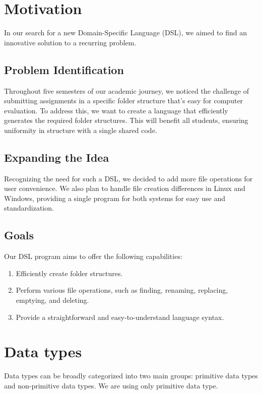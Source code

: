 \documentclass{article}
\begin{document}
\section{Motivation}

In our search for a new Domain-Specific Language (DSL), we aimed to find an innovative solution to a recurring problem.

\subsection{Problem Identification}

Throughout five semesters of our academic journey, we noticed the challenge of submitting assignments in a specific folder structure that's easy for computer evaluation. To address this, we want to create a language that efficiently generates the required folder structures. This will benefit all students, ensuring uniformity in structure with a single shared code.

\subsection{Expanding the Idea}

Recognizing the need for such a DSL, we decided to add more file operations for user convenience. We also plan to handle file creation differences in Linux and Windows, providing a single program for both systems for easy use and standardization.

\subsection{Goals}
Our DSL program aims to offer the following capabilities:

\begin{enumerate}
  \item Efficiently create folder structures.
  \item Perform various file operations, such as finding, renaming, replacing, emptying, and deleting.
  \item Provide a straightforward and easy-to-understand language syntax.
\end{enumerate}

\section{Data types}
Data types can be broadly categorized into two main groups: primitive data types and non-primitive data types. We are using only primitive data type.
\end{document}
